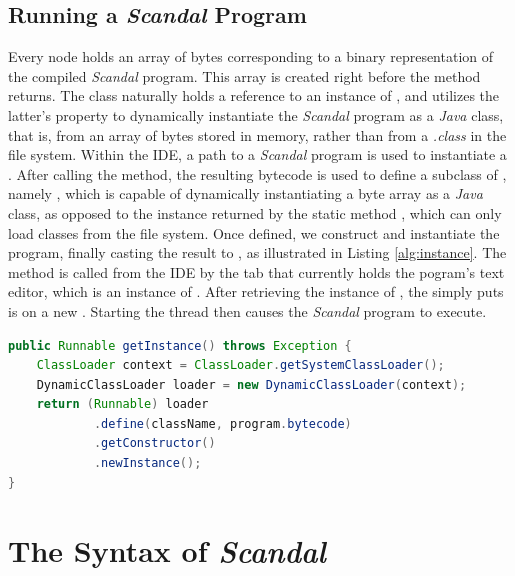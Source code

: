 \subsection{Running a \emph{Scandal} Program}

Every  node holds an array of bytes corresponding to a binary representation of the compiled \emph{Scandal} program. This array is created right before the  method returns. The  class naturally holds a reference to an instance of , and utilizes the latter's  property to dynamically instantiate the \emph{Scandal} program as a \emph{Java} class, that is, from an array of bytes stored in memory, rather than from a \emph{.class} in the file system. Within the IDE, a path to a \emph{Scandal} program is used to instantiate a . After calling the  method, the resulting bytecode is used to define a subclass of , namely , which is capable of dynamically instantiating a byte array as a \emph{Java} class, as opposed to the instance returned by the static method , which can only load classes from the file system. Once defined, we construct and instantiate the program, finally casting the result to , as illustrated in Listing \ref{alg:instance}. The  method is called from the IDE by the tab that currently holds the pogram's text editor, which is an instance of . After retrieving the instance of , the  simply puts is on a new . Starting the thread then causes the \emph{Scandal} program to execute.

\begin{lstlisting}[language=Java,caption={Obtaining an instance of a \emph{Scandal} program.},label={alg:instance}]
public Runnable getInstance() throws Exception {
	ClassLoader context = ClassLoader.getSystemClassLoader();
	DynamicClassLoader loader = new DynamicClassLoader(context);
	return (Runnable) loader
			.define(className, program.bytecode)
			.getConstructor()
			.newInstance();
}
\end{lstlisting}

\section{The Syntax of \emph{Scandal}}

